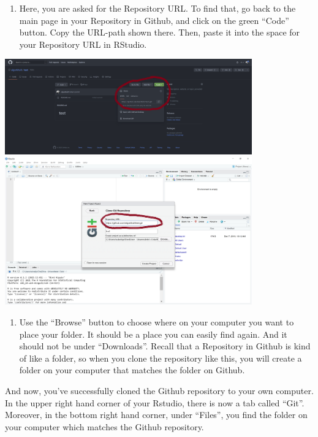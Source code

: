 \documentclass[
]{article}
\providecommand{\tightlist}{%
  \setlength{\itemsep}{0pt}\setlength{\parskip}{0pt}}
\begin{document}
\begin{enumerate}
\def\labelenumi{\arabic{enumi}.}
\setcounter{enumi}{3}
\tightlist
\item
  Here, you are asked for the Repository URL. To find that, go back to
  the main page in your Repository in Github, and click on the green
  ``Code'' button. Copy the URL-path shown there. Then, paste it into
  the space for your Repository URL in RStudio.
\end{enumerate}

\includegraphics[width=0.8\textwidth,height=\textheight]{./figures/project4.png}
\includegraphics[width=0.8\textwidth,height=\textheight]{./figures/project5.png}

\begin{enumerate}
\def\labelenumi{\arabic{enumi}.}
\setcounter{enumi}{4}
\tightlist
\item
  Use the ``Browse'' button to choose where on your computer you want to
  place your folder. It should be a place you can easily find again. And
  it should not be under ``Downloads''. Recall that a Repository in
  Github is kind of like a folder, so when you clone the repository like
  this, you will create a folder on your computer that matches the
  folder on Github.
\end{enumerate}

And now, you've successfully cloned the Github repository to your own
computer. In the upper right hand corner of your Rstudio, there is now a
tab called ``Git''. Moreover, in the bottom right hand corner, under
``Files'', you find the folder on your computer which matches the Github
repository.
\end{document}
